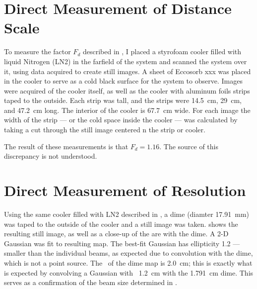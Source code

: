 \section{Direct Measurement of Distance Scale} \label{sec:ch8-dist-scale}

To measure the factor $F_d$ described in , I placed a styrofoam cooler filled with liquid Nitrogen (LN2) in the farfield of the system and scanned the system over it, using data acquired to create still images.
A sheet of Eccosorb xxx was placed in the cooler to serve as a cold black surface for the system to observe.
Images were acquired of the cooler itself, as well as the cooler with aluminum foils strips taped to the outside.
Each strip was  tall, and the strips were \SI{14.5}{\cm}, \SI{29}{\cm}, and \SI{47.2}{\cm} long.
The interior of the cooler is \SI{67.7}{\cm} wide.
For each image the \FWHM width of the strip --- or the cold space inside the cooler --- was calculated by taking a cut through the still image centered n the strip or cooler.

The result of these measurements is that $F_d = 1.16$.
The source of this discrepancy is not understood.




\section{Direct Measurement of Resolution}

Using the same cooler filled with LN2 described in , a dime (diamter \SI{17.91}{\mm}) was taped to the outside of the cooler and a still image was taken.
 shows the resulting still image, as well as a close-up of the are with the dime.
A 2-D Gaussian was fit to resulting map.
The best-fit Gaussian has ellipticity 1.2 --- smaller than the individual beams, as expected due to convolution with the dime, which is not a point source.
The \FWHM\ of the dime map is \SI{2.0}{\cm}; this is exactly what is expected by convolving a Gaussian with \FWHM\ \SI{1.2}{\cm} with the \SI{1.791}{\cm} dime.
This serves as a confirmation of the beam size determined in .

